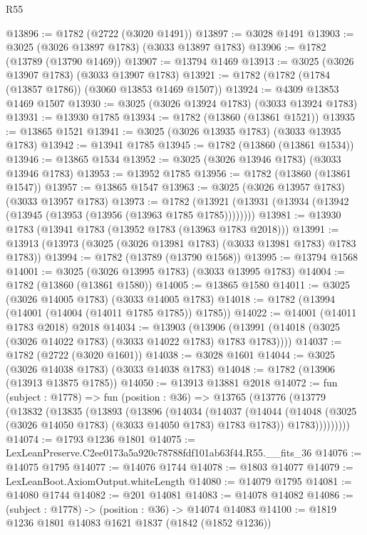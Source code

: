 \begin{lexlean}{R55}
\begin{coremodule}
@13896 := @1782 (@2722 (@3020 @1491))
@13897 := @3028 @1491
@13903 := @3025 (@3026 @13897 @1783) (@3033 @13897 @1783)
@13906 := @1782 (@13789 (@13790 @1469))
@13907 := @13794 @1469
@13913 := @3025 (@3026 @13907 @1783) (@3033 @13907 @1783)
@13921 := @1782 (@1782 (@1784 (@13857 @1786)) (@3060 @13853 @1469 @1507))
@13924 := @4309 @13853 @1469 @1507
@13930 := @3025 (@3026 @13924 @1783) (@3033 @13924 @1783)
@13931 := @13930 @1785
@13934 := @1782 (@13860 (@13861 @1521))
@13935 := @13865 @1521
@13941 := @3025 (@3026 @13935 @1783) (@3033 @13935 @1783)
@13942 := @13941 @1785
@13945 := @1782 (@13860 (@13861 @1534))
@13946 := @13865 @1534
@13952 := @3025 (@3026 @13946 @1783) (@3033 @13946 @1783)
@13953 := @13952 @1785
@13956 := @1782 (@13860 (@13861 @1547))
@13957 := @13865 @1547
@13963 := @3025 (@3026 @13957 @1783) (@3033 @13957 @1783)
@13973 := @1782 (@13921 (@13931 (@13934 (@13942 (@13945 (@13953 (@13956 (@13963 @1785 @1785))))))))
@13981 := @13930 @1783 (@13941 @1783 (@13952 @1783 (@13963 @1783 @2018)))
@13991 := @13913 (@13973 (@3025 (@3026 @13981 @1783) (@3033 @13981 @1783) @1783 @1783))
@13994 := @1782 (@13789 (@13790 @1568))
@13995 := @13794 @1568
@14001 := @3025 (@3026 @13995 @1783) (@3033 @13995 @1783)
@14004 := @1782 (@13860 (@13861 @1580))
@14005 := @13865 @1580
@14011 := @3025 (@3026 @14005 @1783) (@3033 @14005 @1783)
@14018 := @1782 (@13994 (@14001 (@14004 (@14011 @1785 @1785)) @1785))
@14022 := @14001 (@14011 @1783 @2018) @2018
@14034 := @13903
    (@13906 (@13991 (@14018 (@3025 (@3026 @14022 @1783) (@3033 @14022 @1783) @1783 @1783))))
@14037 := @1782 (@2722 (@3020 @1601))
@14038 := @3028 @1601
@14044 := @3025 (@3026 @14038 @1783) (@3033 @14038 @1783)
@14048 := @1782 (@13906 (@13913 @13875 @1785))
@14050 := @13913 @13881 @2018
@14072 := fun (subject : @1778) =>
  fun (position : @36) =>
  @13765
    (@13776
      (@13779
        (@13832
          (@13835
            (@13893
              (@13896
                (@14034
                  (@14037
                    (@14044
                      (@14048 (@3025 (@3026 @14050 @1783) (@3033 @14050 @1783) @1783 @1783))
                      @1783)))))))))
@14074 := @1793 @1236 @1801
@14075 := LexLeanPreserve.C2ee0173a5a920c78788fdf101ab63f44.R55.__fits_36
@14076 := @14075 @1795
@14077 := @14076 @1744
@14078 := @1803 @14077
@14079 := LexLeanBoot.AxiomOutput.whiteLength
@14080 := @14079 @1795
@14081 := @14080 @1744
@14082 := @201 @14081
@14083 := @14078 @14082
@14086 := (subject : @1778) -> (position : @36) -> @14074 @14083
@14100 := @1819
    @1236
    @1801
    @14083
    @1621
    @1837
    (@1842 (@1852 @1236))

\end{coremodule}
\end{lexlean}
